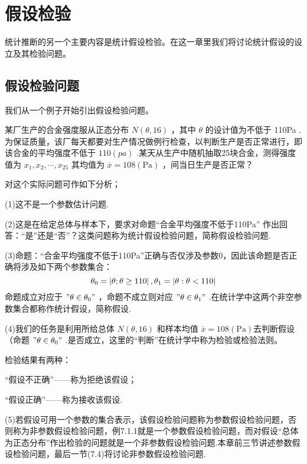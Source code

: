 \chapter{假设检验}
统计推断的另一个主要内容是统计假设检验。在这一章里我们将讨论统计假设的设立及其检验问题。

\section{假设检验问题}
我们从一个例子开始引出假设检验问题。
\begin{problem}
某厂生产的合金强度服从正态分布 $N(\theta,16)$ ，其中 $\theta$ 的设计值为不低于 110Pa .为保证质量，该厂每天都要对生产情况做例行检查，以判断生产是否正常进行，即该合金的平均强度不低于 $110(pa)$ .某天从生产中随机抽取25块合金，测得强度值为 $x_{1},x_{2},\cdots,x_{25}$ 其均值为 $\overline{x}=108(\mathrm {Pa})$ ，间当日生产是否正常？

对这个实际问题可作如下分析；

(1)这不是一个参数估计问题.

(2)这是在给定总体与样本下，要求对命题“合金平均强度不低于110Pa”
作出回答：“是”还是“否”？这类问题称为统计假设检验问题，简称假设检验问题.

(3)命题：“合金平均强度不低于110Pa”正确与否仅涉及参数0，因此该命题是否正确将涉及如下两个参数集合：
\[
\theta_0=\left|\theta ;\theta\geq 110\right|,\\\theta_1=\left|\theta :\theta <110\right|
\]
命题成立对应于 $"\theta\in\theta_0"$ ，命题不成立则对应 $"\theta\in\theta_1"$ .在统计学中这两个非空参数集合都称作统计假设，简称假设.

(4)我们的任务是利用所给总体 $N(\theta,16)$ 和样本均值 $\overline{x}=108(\mathrm {Pa})$去判断假设（命题 $"\theta\in\theta_0"$ .是否成立，这里的“判断”在统计学中称为检验或检验法则。

检验结果有两种：
\begin{center}
	“假设不正确”——称为拒绝该假设；
	
	“假设正确”——称为接收该假设.
\end{center}

(5)若假设可用一个参数的集合表示，该假设检验问题称为参数假设检验问题，否则称为非参数假设检验问题，例7.1.1就是一个参数假设检验问题，而对假设“总体为正态分布”作出检验的问题就是一个非参数假设检验问题.本章前三节讲述参数假设检验问题，最后一节(7.4)将讨论非参数假设检验问题.
\end{problem}